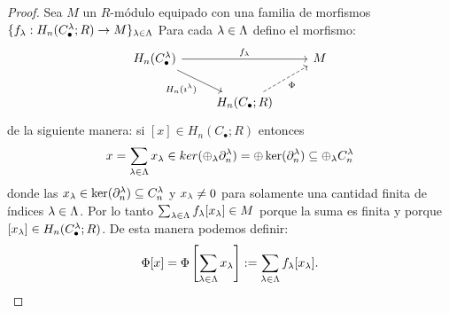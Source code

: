 \begin{proof}
  Sea $M$ un $R$-m\'odulo equipado con una familia de morfismos $\{f_{\lambda}:H_n(C_{\bullet}^{\lambda};R)\rightarrow M\}_{\lambda\in\Lambda}$
  Para cada $\lambda\in\Lambda$ defino el morfismo:
  \begin{equation}\label{diag:prop_universal_suma}
    \begin{tikzcd}
      H_n(C_{\bullet}^{\la}) \arrow[rr,"f_{\la}"] \arrow[dr,"H_n(\imath^{\la})"'] && M \\
      & H_n(C_{\bullet};R) \arrow[ru,dashed,"\Phi"'] &
    \end{tikzcd}
  \end{equation}
  de la siguiente manera: si $[x]\in H_n(C_{\bullet};R)$ entonces
  \[
    x=\sum_{\lambda\in\Lambda}x_{\lambda}\in ker (\oplus_{\lambda}\partial_n^{\lambda})=
    \oplus\ker(\partial_n^{\lambda})\subseteq \oplus_{\lambda}C_n^{\lambda}
  \]
  donde las $x_{\lambda}\in\ker(\partial_n^{\lambda})\subseteq C_n^{\lambda}$ y $x_{\lambda}\neq0$ para solamente una cantidad
  finita de \'indices $\lambda\in\Lambda$. Por lo tanto $\sum_{\lambda\in\Lambda} f_{\lambda}[x_{\lambda}] \in M$
  porque la suma es finita y porque $[x_{\lambda}]\in H_n(C_{\bullet}^{\lambda};R)$. De esta manera podemos definir:
  \[
    \Phi[x]=\Phi\left[ \sum_{\lambda\in\Lambda} x_{\lambda} \right]:=\sum_{\lambda\in\Lambda}f_{\lambda}[x_{\lambda}].
  \]


\end{proof}
